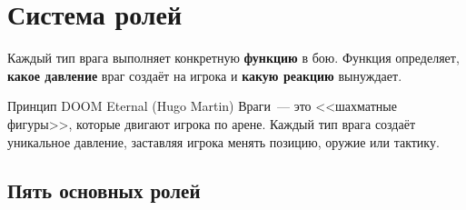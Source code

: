 \documentclass[a4paper,11pt]{report}
\begin{document}
\section{Система ролей}

Каждый тип врага выполняет конкретную \textbf{функцию} в бою.
Функция определяет, \textbf{какое давление} враг создаёт на игрока
и \textbf{какую реакцию} вынуждает.

\begin{principle}{Принцип DOOM Eternal (Hugo Martin)}
Враги~--- это <<шахматные фигуры>>, которые двигают игрока по арене.
Каждый тип врага создаёт уникальное давление, заставляя игрока
менять позицию, оружие или тактику.
\end{principle}

\subsection{Пять основных ролей}
\end{document}
